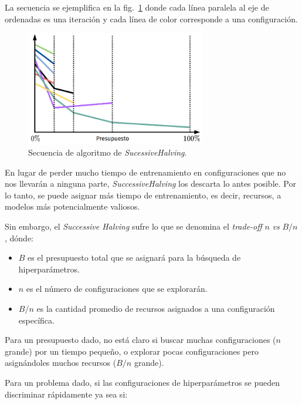 \documentclass[a4paper,12pt]{article}
\begin{document}
La secuencia se ejemplifica en la fig.~\ref{fig:sh} donde cada línea paralela al eje de ordenadas es una iteración y cada línea de color corresponde a una configuración.

\begin{figure}[H]
	\begin{center}
		\includegraphics[width=0.7\textwidth]{sucessive_halving.png}
		\caption{Secuencia de algoritmo de \textit{SucessiveHalving}.}
		\label{fig:sh}
	\end{center}
\end{figure}

\clearpage

En lugar de perder mucho tiempo de entrenamiento en configuraciones que no nos llevarán a ninguna parte, \textit{SuccessiveHalving} los descarta lo antes posible. Por lo tanto, se puede asignar más tiempo de entrenamiento, es decir, recursos, a modelos más potencialmente valiosos.

Sin embargo, el \textit{Successive Halving} sufre lo que se denomina el \textit{trade-off} $n$ \textit{vs} $B/n$ \citep{Bissuel2019Apr}, dónde:
\begin{itemize}[noitemsep, topsep=2pt]
	\item $B$ es el presupuesto total que se asignará para la búsqueda de hiperparámetros.
	\item $n$ es el número de configuraciones que se explorarán.
	\item $B/n$ es la cantidad promedio de recursos asignados a una configuración específica.
\end{itemize}

Para un presupuesto dado, no está claro si buscar muchas configuraciones ($n$ grande) por un tiempo pequeño, o explorar pocas configuraciones pero asignándoles muchos recursos ($B/n$ grande). 

Para un problema dado, si las configuraciones de hiperparámetros se pueden discriminar rápidamente ya sea si:
\end{document}
